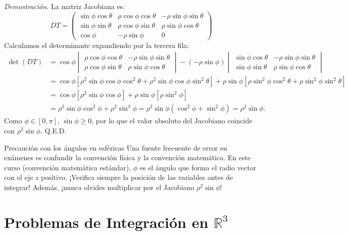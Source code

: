 \documentclass[11pt,a4paper]{article}
\begin{document}
\textit{Demostración.} La matriz Jacobiana es:
\[
D T = \begin{pmatrix}
\sin\phi \cos\theta & \rho \cos\phi \cos\theta & -\rho \sin\phi \sin\theta \\
\sin\phi \sin\theta & \rho \cos\phi \sin\theta & \rho \sin\phi \cos\theta \\
\cos\phi & -\rho \sin\phi & 0
\end{pmatrix}
\]
Calculamos el determinante expandiendo por la tercera fila:
\begin{align*}
\det(D T) &= \cos\phi \begin{vmatrix} \rho \cos\phi \cos\theta & -\rho \sin\phi \sin\theta \\ \rho \cos\phi \sin\theta & \rho \sin\phi \cos\theta \end{vmatrix} - (-\rho \sin\phi) \begin{vmatrix} \sin\phi \cos\theta & -\rho \sin\phi \sin\theta \\ \sin\phi \sin\theta & \rho \sin\phi \cos\theta \end{vmatrix} \\
&= \cos\phi \left[ \rho^2 \sin\phi \cos\phi \cos^2\theta + \rho^2 \sin\phi \cos\phi \sin^2\theta \right] + \rho \sin\phi \left[ \rho \sin^2\phi \cos^2\theta + \rho \sin^2\phi \sin^2\theta \right] \\
&= \cos\phi \left[ \rho^2 \sin\phi \cos\phi \right] + \rho \sin\phi \left[ \rho \sin^2\phi \right] \\
&= \rho^2 \sin\phi \cos^2\phi + \rho^2 \sin^3\phi = \rho^2 \sin\phi (\cos^2\phi + \sin^2\phi) = \rho^2 \sin\phi.
\end{align*}
Como $\phi \in [0, \pi]$, $\sin\phi \geq 0$, por lo que el valor absoluto del Jacobiano coincide con $\rho^2 \sin\phi$. Q.E.D.

\begin{errorbox}{Precaución con los ángulos en esféricas}{}
    Una fuente frecuente de error en exámenes es confundir la convención física y la convención matemática. En este curso (convención matemática estándar), $\phi$ es el ángulo que forma el radio vector con el eje $z$ positivo. ¡Verifica siempre la posición de las variables antes de integrar! Además, ¡nunca olvides multiplicar por el Jacobiano $\rho^2 \sin\phi$!
\end{errorbox}


\section{Problemas de Integración en $\mathbb{R}^3$}
\end{document}
